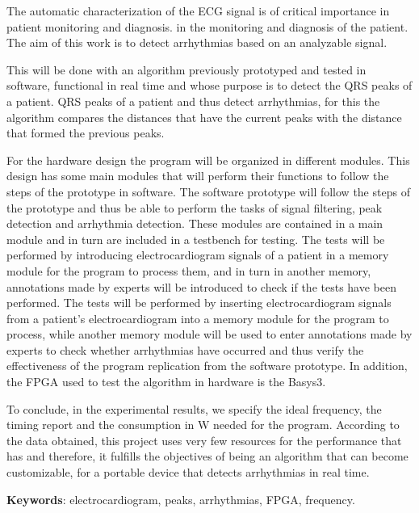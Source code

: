 The automatic characterization of the ECG signal is of critical importance in patient monitoring and diagnosis.
in the monitoring and diagnosis of the patient.
The aim of this work is to detect arrhythmias based on an analyzable signal.

This will be done with an algorithm previously prototyped and tested in software, functional in real time and whose purpose is to detect the QRS peaks of a patient.
QRS peaks of a patient and thus detect arrhythmias, for this the algorithm compares the distances that have the current peaks with the distance that formed the previous peaks.

For the hardware design the program will be organized in different modules. This design has some main modules that will perform their functions to follow the steps of the prototype in software.
The software prototype will follow the steps of the prototype and thus be able to perform the tasks of signal filtering, peak detection and arrhythmia detection.
These modules are contained in a main module and in turn are included in a testbench for testing. 
The tests will be performed by introducing electrocardiogram signals of a patient in a memory module for the program to process them, and in turn in another memory, annotations made by experts will be introduced to check if the tests have been performed.
The tests will be performed by inserting electrocardiogram signals from a patient's electrocardiogram into a memory module for the program to process, while another memory module will be used to enter annotations made by experts to check whether arrhythmias have occurred and thus verify the effectiveness of the program replication from the software prototype.  In addition, the FPGA used to test the algorithm in hardware is the Basys3.

To conclude, in the experimental results, we specify the ideal frequency, the timing report and the
consumption in W needed for the program. According to the data obtained, this project uses very few resources for the performance that has
and therefore, it fulfills the objectives of being an algorithm that can become customizable, for a portable device that detects arrhythmias in real time.

\noindent\textbf{Keywords}: electrocardiogram, peaks, arrhythmias, FPGA, frequency.